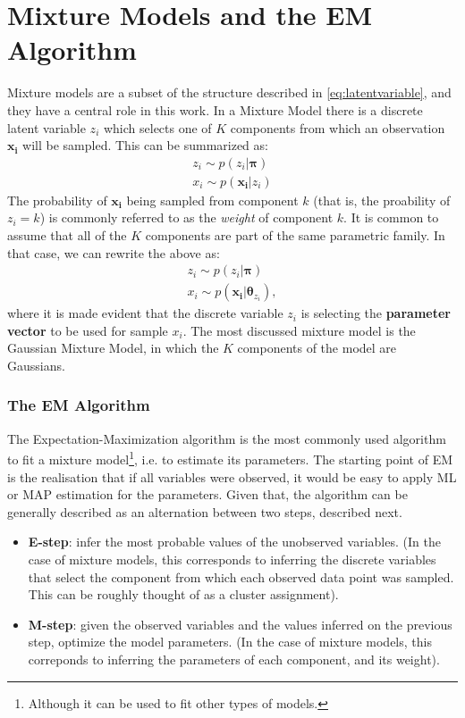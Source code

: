 \section{Mixture Models and the EM Algorithm}
\label{section:mmodels}
Mixture models are a subset of the structure  described in \ref{eq:latentvariable},
and they have a central role in this work. In a Mixture Model there is a discrete
latent variable $z_i$ which selects one of $K$ components from which an observation
$\bm{x_i}$ will be sampled. This can be summarized as:
\begin{align}
    z_i \sim p(z_i | \bm\pi) \\
    x_i \sim p(\bm{x_i} | z_i)
\end{align}
The probability of $\bm{x_i}$ being sampled from component $k$ (that is, the proability
of $z_i = k$) is commonly referred to as the \emph{weight} of component $k$.
It is common to assume that all of the $K$ components are part of the same
parametric family. In that case, we can rewrite the above as:
\begin{align}
    z_i \sim p(z_i | \bm\pi) \\
    x_i \sim p(\bm{x_i} | \bm{\theta}_{z_i}),
\end{align} where it is made evident that the discrete variable $z_i$ is selecting
the \textbf{parameter vector} to be used for sample $x_i$. The most discussed mixture
model is the Gaussian Mixture Model, in which the $K$ components of the model are
Gaussians.

\subsubsection{The EM Algorithm}
The Expectation-Maximization algorithm is the most commonly used algorithm to
fit a mixture model\footnote{Although it can be used to fit other types of models.}, i.e.
to estimate its parameters. The starting point of EM is the realisation that if
all variables were observed, it would be easy to apply ML or MAP estimation for
the parameters. Given that, the algorithm can be generally described as an alternation
between two steps, described next.
\begin{itemize}
    \item \textbf{E-step}: infer the most probable values of the unobserved variables.
        (In the case of mixture models, this corresponds to inferring the discrete
        variables that select the component from which each observed data point
        was sampled. This can be roughly thought of as a cluster assignment).
    \item \textbf{M-step}: given the observed variables and the values inferred
        on the previous step, optimize the model parameters. (In the case of 
        mixture models, this correponds to inferring the parameters of each
        component, and its weight).
\end{itemize}

